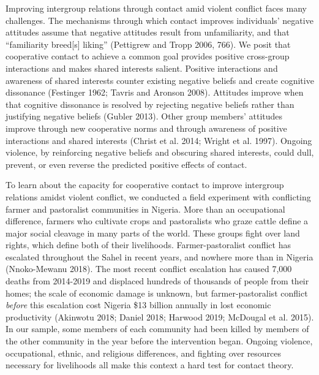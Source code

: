 \documentclass[11pt]{article}
\begin{document}
Improving intergroup relations through contact amid violent conflict
faces many challenges. The mechanisms through which contact improves
individuals' negative attitudes assume that negative attitudes result
from unfamiliarity, and that ``familiarity breed{[}s{]} liking''
(Pettigrew and Tropp 2006, 766). We posit that cooperative contact to
achieve a common goal provides positive cross-group interactions and
makes shared interests salient. Positive interactions and awareness of
shared interests counter existing negative beliefs and create cognitive
dissonance (Festinger 1962; Tavris and Aronson 2008). Attitudes improve
when that cognitive dissonance is resolved by rejecting negative beliefs
rather than justifying negative beliefs (Gubler 2013). Other group
members' attitudes improve through new cooperative norms and through
awareness of positive interactions and shared interests (Christ et al.
2014; Wright et al. 1997). Ongoing violence, by reinforcing negative
beliefs and obscuring shared interests, could dull, prevent, or even
reverse the predicted positive effects of contact.

To learn about the capacity for cooperative contact to improve
intergroup relations amidst violent conflict, we conducted a field
experiment with conflicting farmer and pastoralist communities in
Nigeria. More than an occupational difference, farmers who cultivate
crops and pastoralists who graze cattle define a major social cleavage
in many parts of the world. These groups fight over land rights, which
define both of their livelihoods. Farmer-pastoralist conflict has
escalated throughout the Sahel in recent years, and nowhere more than in
Nigeria (Nnoko-Mewanu 2018). The most recent conflict escalation has
caused 7,000 deaths from 2014-2019 and displaced hundreds of thousands
of people from their homes; the scale of economic damage is unknown, but
farmer-pastoralist conflict \emph{before} this escalation cost Nigeria
\$13 billion annually in lost economic productivity (Akinwotu 2018;
Daniel 2018; Harwood 2019; McDougal et al. 2015). In our sample, some
members of each community had been killed by members of the other
community in the year before the intervention began. Ongoing violence,
occupational, ethnic, and religious differences, and fighting over
resources necessary for livelihoods all make this context a hard test
for contact theory.
\end{document}
